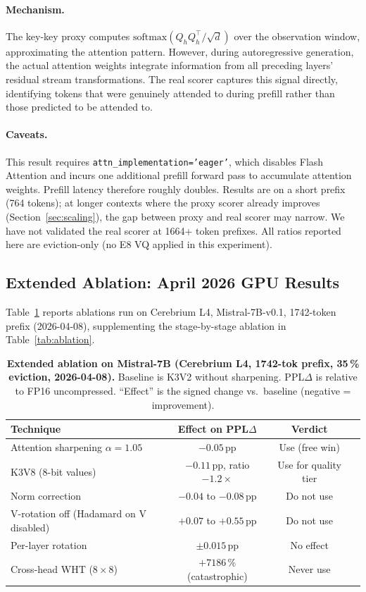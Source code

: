 \documentclass{article}
\begin{document}
\paragraph{Mechanism.}
The key-key proxy computes $\text{softmax}(Q_hQ_h^\top/\sqrt{d})$ over the
observation window, approximating the attention pattern. However, during
autoregressive generation, the actual attention weights integrate information
from all preceding layers' residual stream transformations. The real scorer
captures this signal directly, identifying tokens that were genuinely attended
to during prefill rather than those predicted to be attended to.

\paragraph{Caveats.}
This result requires \texttt{attn\_implementation='eager'}, which disables Flash
Attention and incurs one additional prefill forward pass to accumulate attention
weights. Prefill latency therefore roughly doubles. Results are on a short prefix
(764 tokens); at longer contexts where the proxy scorer already improves
(Section~\ref{sec:scaling}), the gap between proxy and real scorer may narrow.
We have not validated the real scorer at 1664+ token prefixes. All ratios reported
here are eviction-only (no E8 VQ applied in this experiment).

\subsection{Extended Ablation: April 2026 GPU Results}
\label{sec:ablation2}

Table~\ref{tab:ablation2} reports ablations run on Cerebrium L4, Mistral-7B-v0.1,
1742-token prefix (2026-04-08), supplementing the stage-by-stage ablation in
Table~\ref{tab:ablation}.

\begin{table}[h]
\centering
\caption{\textbf{Extended ablation on Mistral-7B (Cerebrium L4, 1742-tok prefix,
  35\,\% eviction, 2026-04-08).} Baseline is K3V2 without sharpening.
  PPL$\Delta$ is relative to FP16 uncompressed.  ``Effect'' is the signed
  change vs.\ baseline (negative = improvement).}
\label{tab:ablation2}
\begin{tabular}{@{}lccc@{}}
\toprule
Technique & Effect on PPL$\Delta$ & Verdict \\
\midrule
Attention sharpening $\alpha{=}1.05$ & $-0.05$\,pp & Use (free win) \\
K3V8 (8-bit values)   & $-0.11$\,pp, ratio $-1.2\times$ & Use for quality tier \\
Norm correction       & $-0.04$ to $-0.08$\,pp & Do not use \\
V-rotation off (Hadamard on V disabled) & $+0.07$ to $+0.55$\,pp & Do not use \\
Per-layer rotation    & $\pm 0.015$\,pp & No effect \\
Cross-head WHT ($8{\times}8$) & $+7186$\,\% (catastrophic) & Never use \\
\bottomrule
\end{tabular}
\end{table}
\end{document}
